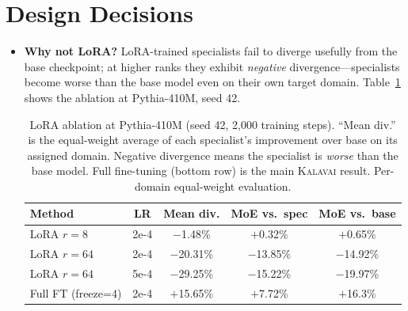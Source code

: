 \documentclass{article}
\newcommand{\kalavai}{\textsc{Kalavai}\xspace}
\begin{document}
\section{Design Decisions}
\label{app:design}

\begin{itemize}[leftmargin=*, itemsep=4pt]
  \item \textbf{Why not LoRA?} LoRA-trained specialists fail to diverge usefully from the base checkpoint; at higher ranks they exhibit \emph{negative} divergence---specialists become worse than the base model even on their own target domain. Table~\ref{tab:lora} shows the ablation at Pythia-410M, seed 42.

\begin{table}[h]
\centering
\caption{LoRA ablation at Pythia-410M (seed 42, 2,000 training steps). ``Mean div.'' is the equal-weight average of each specialist's improvement over base on its assigned domain. Negative divergence means the specialist is \emph{worse} than the base model. Full fine-tuning (bottom row) is the main \kalavai result. Per-domain equal-weight evaluation.}
\label{tab:lora}
\small
\begin{tabular}{lcccc}
\toprule
\textbf{Method} & \textbf{LR} & \textbf{Mean div.} & \textbf{MoE vs.\ spec} & \textbf{MoE vs.\ base} \\
\midrule
LoRA $r=8$              & 2e-4 & $-$1.48\%  & $+$0.32\%  & $+$0.65\% \\
LoRA $r=64$             & 2e-4 & $-$20.31\% & $-$13.85\% & $-$14.92\% \\
LoRA $r=64$             & 5e-4 & $-$29.25\% & $-$15.22\% & $-$19.97\% \\
\midrule
Full FT (freeze=4) & 2e-4 & $+$15.65\% & $+$7.72\%  & $+$16.3\% \\
\bottomrule
\end{tabular}
\end{table}


\end{itemize}
\end{document}

